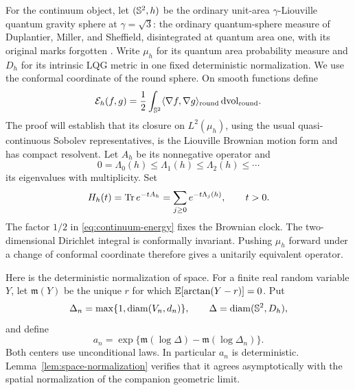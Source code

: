 For the continuum object, let \((\mathbb S^2,h)\) be the ordinary unit-area
\(\gamma\)-Liouville quantum gravity sphere at \(\gamma=\sqrt3\):
the ordinary quantum-sphere measure of Duplantier, Miller, and Sheffield,
disintegrated at quantum area one, with its original marks forgotten
\cite[Definition~4.21(ii)]{DuplantierMillerSheffield2021Mating}.
Write \(\mu_h\) for its quantum area probability measure and \(D_h\) for
its intrinsic LQG metric in one fixed deterministic normalization.  We use
the conformal coordinate of the round sphere.  On smooth functions define
\begin{equation}\label{eq:continuum-energy}
 \mathcal E_h(f,g)=\frac12\int_{\mathbb S^2}
       \langle \nabla f,\nabla g\rangle_{\mathrm{round}}\,\mathrm d\mathrm{vol}_{\mathrm{round}}.
\end{equation}
The proof will establish that its closure on \(L^2(\mu_h)\), using the usual
quasi-continuous Sobolev representatives, is the Liouville Brownian motion
form and has compact resolvent.  Let \(A_h\) be its nonnegative operator and
\[
 0=\Lambda_0(h)\le\Lambda_1(h)\le\Lambda_2(h)\le\cdots
\]
its eigenvalues with multiplicity.  Set
\begin{equation}\label{eq:continuum-heat-trace}
 H_h(t)=\operatorname{Tr} e^{-tA_h}=\sum_{j\ge0}e^{-t\Lambda_j(h)},\qquad t>0.
\end{equation}
The factor \(1/2\) in \eqref{eq:continuum-energy} fixes the Brownian clock.
The two-dimensional Dirichlet integral is conformally invariant.  Pushing
\(\mu_h\) forward under a change of conformal coordinate therefore gives a
unitarily equivalent operator.

Here is the deterministic normalization of space.  For a finite real random
variable \(Y\), let \(\mathfrak m(Y)\) be the unique \(r\) for which
\(\mathbb E[\arctan(Y-r)]=0\).  Put
\[
 \Delta_n=\max\{1,\operatorname{diam}(V_n,d_n)\},\qquad
 \Delta=\operatorname{diam}(\mathbb S^2,D_h),
\]
and define
\begin{equation}\label{eq:distance-normalization}
 a_n=\exp\{\mathfrak m(\log\Delta)-\mathfrak m(\log\Delta_n)\}.
\end{equation}
Both centers use unconditional laws.  In particular \(a_n\) is deterministic.
Lemma~\ref{lem:space-normalization} verifies that it agrees asymptotically
with the spatial normalization of the companion geometric limit.

